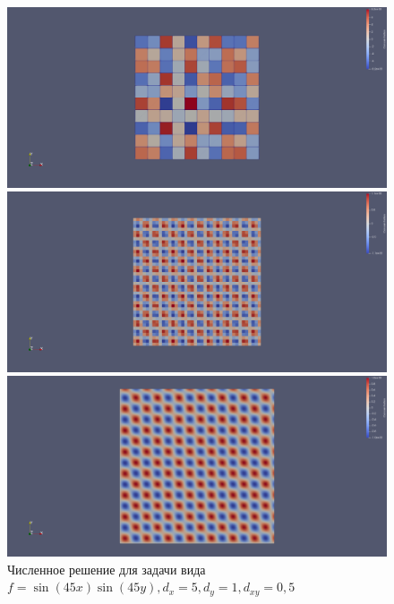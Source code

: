 \documentclass{article}
\begin{document}
\begin{figure}[!htb]
	\includegraphics[width=\textwidth]{img/plot1.png}
	\caption{$u, d = 0.15$}
	\endminipage\hfill
	\includegraphics[width=\textwidth]{img/plot2.png}
	\caption{$u, d = 0.035$}
	\endminipage\hfill
	\includegraphics[width=\textwidth]{img/plot3.png}
	\caption{$u, d = 0.007$}
	\endminipage
	\caption{Численное решение для задачи вида $f = \sin(45 x) \sin(45 y), d_x = 5, d_y = 1, d_{xy} = 0,5$}
\end{figure}
\end{document}
